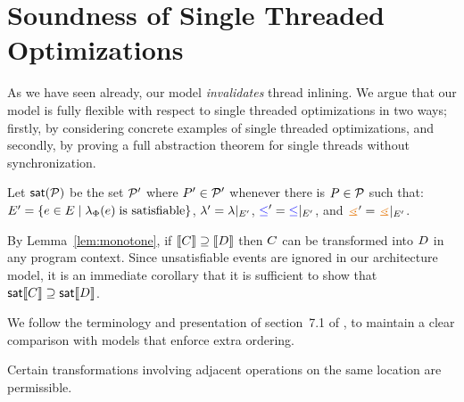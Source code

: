 \section{Soundness of Single Threaded Optimizations}
\label{sec:opt}

As we have seen already, our model {\em invalidates} thread inlining.  We
argue that our model is fully flexible with respect to single threaded
optimizations in two ways; firstly, by considering concrete examples of
single threaded optimizations, and secondly, by proving a full abstraction
theorem for single threads without synchronization.  



Let $\mathsf{sat}(\mathcal{P})$ be the set $\mathcal{P}'$ where $P'\in\mathcal{P}'$ whenever
there is $P\in\mathcal{P}$ such that:
$E' = \{e \in E\mid \lambda_{\Phi}(e)\;\text{is satisfiable}\}$,
${\lambda'} = {\lambda}\mathbin{|}_{E'}$, 
${\mathrel{{\color{blue}\leq}}'} = {\mathrel{{\color{blue}\leq}}}\mathbin{|}_{E'}$, and
${\gtN'} = {\gtN}\restrict{\Event'}$.

By Lemma~\ref{lem:monotone}, if $\llbracket C\rrbracket \supseteq \llbracket D\rrbracket$
then $C$ can be transformed into $D$ in any program context.  Since
unsatisfiable events are ignored in our architecture model, it is
an immediate corollary that it is sufficient to show that
$\mathsf{sat}\llbracket C\rrbracket \supseteq \mathsf{sat}\llbracket D\rrbracket$.




We follow the terminology and presentation of section~7.1 of
\citet{Dolan:2018:BDR:3192366.3192421}, to maintain a clear comparison with
models that enforce extra ordering.

Certain transformations involving adjacent operations on the same location
are permissible. 
 
